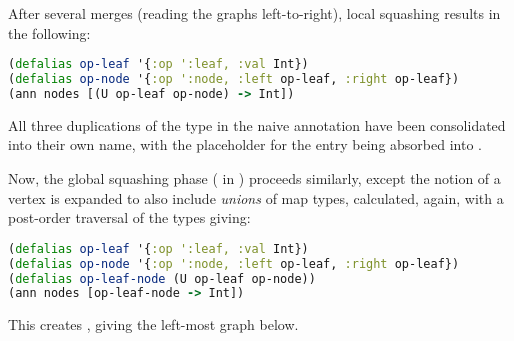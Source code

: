 
After several merges (reading the graphs left-to-right), local squashing results in the following:

\begin{lstlisting}[language=Clojure]
(defalias op-leaf '{:op ':leaf, :val Int})
(defalias op-node '{:op ':node, :left op-leaf, :right op-leaf})
(ann nodes [(U op-leaf op-node) -> Int])
\end{lstlisting}

All three duplications of the  type in the naive annotation have
been consolidated into their own name,
with the  placeholder for the  entry being absorbed into .

Now, the global squashing phase (\squashglobal{} in )
proceeds similarly, except the notion of a vertex is expanded to also include
\emph{unions} of map types, calculated, again, with a post-order traversal of the types
giving:

\begin{lstlisting}[language=Clojure]
(defalias op-leaf '{:op ':leaf, :val Int})
(defalias op-node '{:op ':node, :left op-leaf, :right op-leaf})
(defalias op-leaf-node (U op-leaf op-node))
(ann nodes [op-leaf-node -> Int])
\end{lstlisting}

This creates , giving the left-most graph below.

